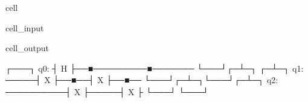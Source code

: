 \documentclass[letterpaper,10pt,english]{jupyterBook}
\begin{document}
\begin{sphinxuseclass}{cell}\begin{sphinxVerbatimInput}

\begin{sphinxuseclass}{cell_input}
\begin{sphinxVerbatim}[commandchars=\\\{\}]
   


\end{sphinxVerbatim}

\end{sphinxuseclass}\end{sphinxVerbatimInput}
\begin{sphinxVerbatimOutput}

\begin{sphinxuseclass}{cell_output}
\begin{sphinxVerbatim}[commandchars=\\\{\}]
     ┌───┐
q\PYGZus{}0: ┤ H ├──■─────────■───────
     └───┘┌─┴─┐     ┌─┴─┐
q\PYGZus{}1: ─────┤ X ├──■──┤ X ├──■──
          └───┘┌─┴─┐└───┘┌─┴─┐
q\PYGZus{}2: ──────────┤ X ├─────┤ X ├
               └───┘     └───┘
\end{sphinxVerbatim}

\end{sphinxuseclass}\end{sphinxVerbatimOutput}

\end{sphinxuseclass}
\end{document}
